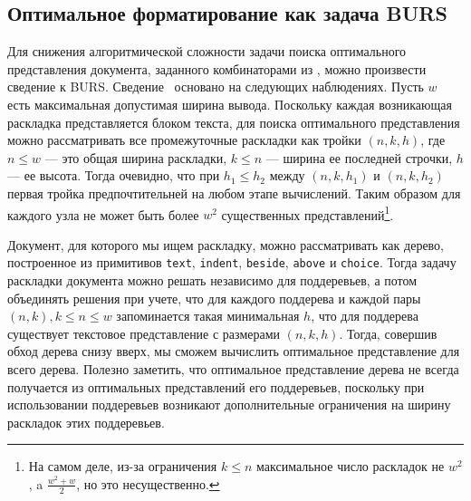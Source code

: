 
\subsection{Оптимальное форматирование как задача BURS}

Для снижения алгоритмической сложности задачи поиска
оптимального представления документа, заданного комбинаторами из \cite{swierstra},
можно произвести сведение к BURS.
Сведение~\cite{podkopaevBoulytchev} основано на следующих наблюдениях.
Пусть $w$ есть максимальная допустимая
ширина вывода. Поскольку каждая возникающая раскладка представляется блоком
текста, для поиска оптимального представления можно рассматривать
все промежуточные раскладки
как тройки $(n, k, h)$, где $n \le w$ --- это общая ширина раскладки, $k \le n$ ---
ширина ее последней строчки, $h$ --- ее высота. Тогда очевидно, что при $h_1 \le h_2$
между $(n, k, h_1)$ и $(n, k, h_2)$ первая тройка предпочтительней на любом этапе вычислений.
Таким образом для каждого узла не может быть более $w^2$ существенных представлений\footnote{
На самом деле, из-за ограничения $k \le n$ максимальное число раскладок не $w^2$, a
$\frac{w^2 + w}{2}$, но это несущественно.}.

Документ, для которого мы ищем раскладку, можно рассматривать как дерево, построенное из примитивов
\lstinline[language=Haskell]{text},
\lstinline[language=Haskell]{indent},
\lstinline[language=Haskell]{beside},
\lstinline[language=Haskell]{above} и \lstinline[language=Haskell]{choice}. Тогда задачу
раскладки документа можно решать независимо для поддеревьев, а потом объединять решения
при учете, что для каждого поддерева
и каждой пары $(n, k), k \le n \le w$ запоминается такая минимальная $h$, что для поддерева существует
текстовое представление с размерами $(n, k, h)$. Тогда, совершив обход дерева снизу вверх, мы сможем
вычислить оптимальное представление для всего дерева. Полезно заметить,
что оптимальное представление дерева не всегда получается из оптимальных представлений его
поддеревьев, поскольку при использовании поддеревьев возникают дополнительные
ограничения на ширину раскладок этих поддеревьев.

